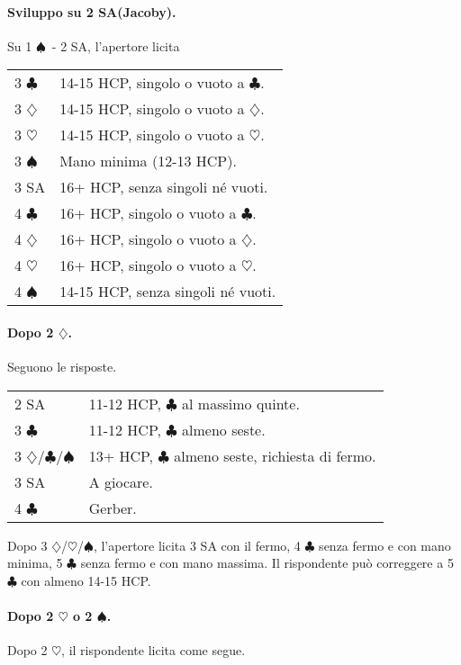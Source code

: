 \documentclass[a4paper,10pt]{article}
\renewcommand{\c}{$\clubsuit$\xspace}
\renewcommand{\d}{$\diamondsuit$\xspace}
\newcommand{\h}{$\heartsuit$\xspace}
\newcommand{\s}{$\spadesuit$\xspace}
\newcommand{\sa}{SA\xspace}
\newcommand{\smallspace}{\vskip0.3cm}
\newenvironment{twocol}
  {\smallspace\noindent\begin{tabular}{l p{0.78\textwidth}}}
  {\end{tabular}\smallspace}
\begin{document}
\paragraph{Sviluppo su 2 \sa (Jacoby).} Su 1 \s\ - 2 \sa, l'apertore licita
\begin{twocol}
	3 \c & 14-15 HCP, singolo o vuoto a \c.\\
	3 \d & 14-15 HCP, singolo o vuoto a \d.\\
	3 \h & 14-15 HCP, singolo o vuoto a \h.\\
	3 \s & Mano minima (12-13 HCP).\\
	3 \sa & 16+ HCP, senza singoli né vuoti.\\
	4 \c & 16+ HCP, singolo o vuoto a \c.\\
	4 \d & 16+ HCP, singolo o vuoto a \d.\\
	4 \h & 16+ HCP, singolo o vuoto a \h.\\
	4 \s & 14-15 HCP, senza singoli né vuoti.
\end{twocol}


\paragraph{Dopo 2 \d.}

Seguono le risposte.

\begin{twocol}
	2 \sa & 11-12 HCP, \c al massimo quinte. \\
	3 \c & 11-12 HCP, \c almeno seste. \\
	3 \d/\c/\s & 13+ HCP, \c almeno seste, richiesta di fermo. \\
	3 \sa & A giocare. \\
	4 \c & Gerber.
\end{twocol}

Dopo 3 \d/\h/\s, l'apertore licita 3 \sa con il fermo, 4 \c senza fermo e con mano minima, 5 \c senza fermo e con mano massima. Il rispondente può correggere a 5 \c con almeno 14-15 HCP.

\paragraph{Dopo 2 \h o 2 \s.}

Dopo 2 \h, il rispondente licita come segue.
\end{document}

